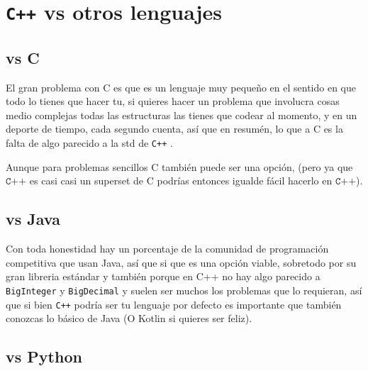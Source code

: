 \documentclass[12pt, fleqn]{report}                             %
\newcommand \Quote              {\qq}                           %
\theoremstyle{break}                                            %
\newcommand \Cpp  {\texttt{C++} }                               %
\begin{document}
        \section{\Cpp vs otros lenguajes}

            \subsection{vs C}

                El gran problema con C es que es un lenguaje muy pequeño en el sentido en que todo lo tienes que hacer tu,
                si quieres hacer un problema que involucra cosas medio complejas todas las estructuras las tienes que codear
                al momento, y en un deporte de tiempo, cada segundo cuenta, así que en resumén, lo que \Quote{mata} a C es la falta
                de algo parecido a la std de \Cpp.

                Aunque para problemas sencillos C también puede ser una opción, (pero ya que $\Cpp$ es casi casi
                un superset de C podrías entonces igualde fácil hacerlo en $\Cpp$).

            \subsection{vs Java}

                Con toda honestidad hay un porcentaje de la comunidad de programación competitiva que usan Java, así que
                si que es una opción viable, sobretodo por su gran libreria estándar y también porque en C++ no hay algo parecido
                a \texttt{BigInteger} y \texttt{BigDecimal} y suelen ser muchos los problemas que lo requieran, así que si bien \Cpp
                podría ser tu lenguaje por defecto es importante que también conozcas lo básico de Java (O Kotlin si quieres ser feliz).

            \subsection{vs Python}
\end{document}
